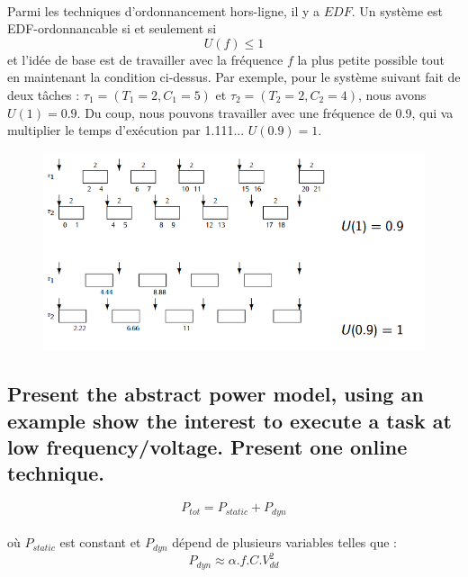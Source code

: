 \paragraph{}
Parmi les techniques d'ordonnancement hors-ligne, il y a $EDF$.
Un système est EDF-ordonnancable si et seulement si 
\begin{equation*}
U(f) \leq 1
\end{equation*}
et l'idée de base est de travailler avec la fréquence $f$ la plus petite possible tout en maintenant la condition ci-dessus. Par exemple, pour le système suivant fait de deux tâches : $\tau_{1} = (T_{1} = 2, C_{1} = 5)$ et $\tau_{2} = (T_{2} = 2, C_{2} = 4)$, nous avons $U(1) = 0.9$. Du coup, nous pouvons travailler avec une fréquence de 0.9, qui va multiplier le temps d'exécution par 1.111... $U(0.9) = 1$.
\begin{figure}[H]
\centering
\includegraphics[width=\textwidth]{img_6_1__1}
\end{figure}

\subsection{Present the abstract power model, using an example show the interest to execute a task at low frequency/voltage. Present one online technique.}
\begin{equation*}
P_{tot} = P_{static} + P_{dyn}
\end{equation*}
\paragraph{}
où $P_{static}$ est constant et $P_{dyn}$ dépend de plusieurs variables telles que :
\begin{equation*}
P_{dyn} \approx \alpha . f . C . V_{dd}^2
\end{equation*}
